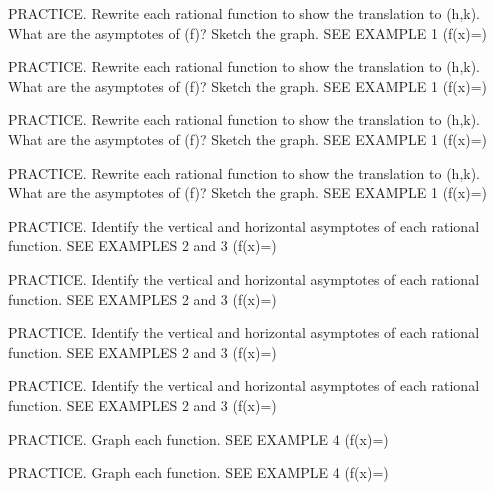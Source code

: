 \documentclass{article}
\newenvironment{practice}[2]{}{}        %
\newcommand{\answer}[1]{}               %
\begin{document}
\begin{practice}{14}{1}
PRACTICE. Rewrite each rational function to show the translation to (h,k). What are the asymptotes of (f)? Sketch the graph. SEE EXAMPLE 1
(f(x)=)
\answer{See back of book.}
\end{practice}
\begin{practice}{15}{1}
PRACTICE. Rewrite each rational function to show the translation to (h,k). What are the asymptotes of (f)? Sketch the graph. SEE EXAMPLE 1
(f(x)=)
\answer{See back of book.}
\end{practice}
\begin{practice}{16}{1}
PRACTICE. Rewrite each rational function to show the translation to (h,k). What are the asymptotes of (f)? Sketch the graph. SEE EXAMPLE 1
(f(x)=)
\answer{See back of book.}
\end{practice}
\begin{practice}{17}{1}
PRACTICE. Rewrite each rational function to show the translation to (h,k). What are the asymptotes of (f)? Sketch the graph. SEE EXAMPLE 1
(f(x)=)
\answer{See back of book.}
\end{practice}
\begin{practice}{18}{1}
PRACTICE. Identify the vertical and horizontal asymptotes of each rational function. SEE EXAMPLES 2 and 3
(f(x)=)
\answer{See back of book.}
\end{practice}
\begin{practice}{19}{1}
PRACTICE. Identify the vertical and horizontal asymptotes of each rational function. SEE EXAMPLES 2 and 3
(f(x)=)
\answer{See back of book.}
\end{practice}
\begin{practice}{20}{1}
PRACTICE. Identify the vertical and horizontal asymptotes of each rational function. SEE EXAMPLES 2 and 3
(f(x)=)
\answer{See back of book.}
\end{practice}
\begin{practice}{21}{1}
PRACTICE. Identify the vertical and horizontal asymptotes of each rational function. SEE EXAMPLES 2 and 3
(f(x)=)
\answer{See back of book.}
\end{practice}
\begin{practice}{22}{1}
PRACTICE. Graph each function. SEE EXAMPLE 4
(f(x)=)
\answer{See back of book.}
\end{practice}
\begin{practice}{23}{1}
PRACTICE. Graph each function. SEE EXAMPLE 4
(f(x)=)
\answer{See back of book.}
\end{practice}
\end{document}
